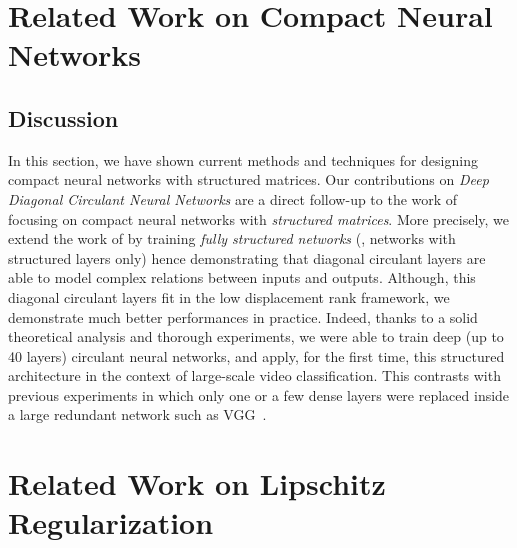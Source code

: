 

\section{Related Work on Compact Neural Networks}
\label{section:ch3-related_work_on_compact_neural_networks}



\subsection{Discussion}

In this section, we have shown current methods and techniques for designing compact neural networks with structured matrices. 
Our contributions on \emph{Deep Diagonal Circulant Neural Networks} are a direct follow-up to the work of~\citet{cheng2015exploration,sindhwani2015structured,moczulski2016acdc,thomas2018learning} focusing on compact neural networks with \emph{structured matrices}.
More precisely, we extend the work of \citet{moczulski2016acdc} by training \emph{fully structured networks} (\ie, networks with structured layers only) hence demonstrating that diagonal circulant layers are able to model complex relations between inputs and outputs.
Although, this diagonal circulant layers fit in the low displacement rank framework, we demonstrate much better performances in practice.
Indeed, thanks to a solid theoretical analysis and thorough experiments, we were able to train deep (up to 40 layers) circulant neural networks, and apply, for the first time, this structured architecture in the context of large-scale video classification.
This contrasts with previous experiments in which only one or a few dense layers were replaced inside a large redundant network such as VGG~\cite{simonyan2014very}.


\section{Related Work on Lipschitz Regularization}
\label{section:ch3-related_work_on_lipschitz_regularization}


